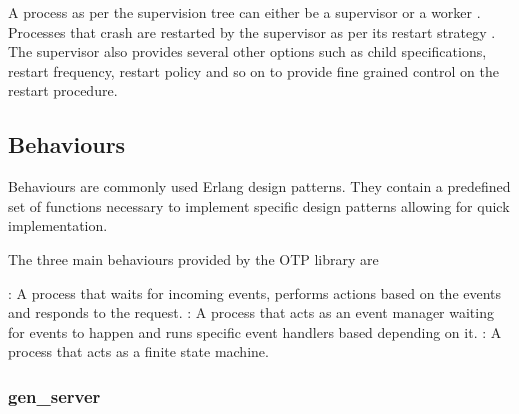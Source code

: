 A process as per the supervision tree can either be a supervisor%
or a worker%
. Processes that crash are restarted by the supervisor as per its
restart strategy%
. The supervisor also provides several other options such as child
specifications, restart frequency, restart policy and so on to provide
fine grained control on the restart procedure.

\subsection{Behaviours}
\label{section:concepts.behaviours}
Behaviours are commonly used Erlang design patterns. They contain a predefined
set of functions necessary to implement specific design patterns allowing for
quick implementation.

The three main behaviours provided by the OTP library are

\begin{itemize}
    : A process that waits for incoming events, performs
    actions based on the events and responds to the request.
    : A process that acts as an event manager waiting for
    events to happen and runs specific event handlers based depending on it.
    : A process that acts as a finite state machine.
\end{itemize}

\subsubsection{gen\_server}
\label{section:gen.server}


